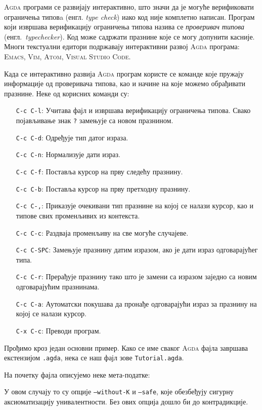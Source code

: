 \textsc{Agda} програми се развијају интерактивно, што значи да је могуће верификовати ограничења типовa (енгл. \emph{type check}) иако код није комплетно написан. Програм који извршава верификацију ограничења типова назива се \emph{проверивач типова} (енгл.~\emph{typechecker}). Код може садржати празнине које се могу допунити касније. Многи текстуални едитори подржавају интерактивни развој \textsc{Agda} програма: \textsc{Emacs}, \textsc{Vim}, \textsc{Atom}, \textsc{Visual Studio Code}.

Када се интерактивно развија \textsc{Agda} програм користе се команде које пружају информације од проверивача типова, као и начине на које можемо обрађивати празнине. Неке од корисних команди су:

\begin{itemize}
    \item[\texttt{C-c C-l}:]{Учитава фајл и извршава верификацију ограничења типова. Свако појављивање знак \texttt{?} замењује са новом празнином.}
    \item[\texttt{C-c C-d}:]{Одређује тип датог израза.}
    \item[\texttt{C-c C-n}:]{Нормализује дати израз.}
    \item[\texttt{C-c C-f}:]{Поставља курсор на прву следећу празнину.}
    \item[\texttt{C-c C-b}:]{Поставља курсор на прву претходну празнину.}
    \item[\texttt{C-c C-,}:]{Приказује очекивани тип празнине на којој се налази курсор, као и типове свих променљивих из контекста.}
    \item[\texttt{C-c C-c}:]{Раздваја променљиву на све могуће случајеве.}
    \item[\texttt{C-c C-SPC}:]{Замењује празнину датим изразом, ако је дати израз одговарајућег типа.}
    \item[\texttt{C-c C-r}:]{Прерађује празнину тако што је замени са изразом заједно са новим одговарајућим празнинама.}
    \item[\texttt{C-c C-a}:]{Аутоматски покушава да пронађе одговарајући израз за празнину на којој се налази курсор.}
    \item[\texttt{C-x C-c}:]{Преводи програм.}
\end{itemize}

Прођимо кроз један основни пример. Како се име сваког \textsc{Agda} фајла завршава екстензијом \texttt{.agda}, нека се наш фајл зове \texttt{Tutorial.agda}.

На почетку фајла описујемо неке мета-податке:
\begin{code}%
\>[0]\AgdaSymbol{\{-\#}\AgdaSpace{}%
\AgdaSpace{}%
\AgdaSpace{}%
\AgdaSpace{}%
\AgdaSymbol{\#-\}}\<%
\end{code}
У овом случају то су опције \texttt{--without-K} и \texttt{--safe}, које обезбеђују сигурну аксиоматизацију унивалентности. Без ових опција дошло би до контрадикције.


